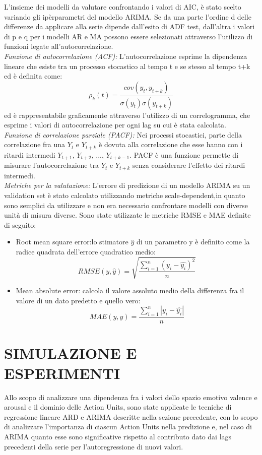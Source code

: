 \documentclass[10pt,journal,compsoc]{IEEEtran}
\begin{document}
L'insieme dei modelli da valutare confrontando i valori di AIC, è stato scelto variando gli ipèrparametri del modello ARIMA. Se da una parte l'ordine d delle differenze da applicare alla serie  dipende dall'esito di ADF test, dall'altra i valori di p e q per i modelli AR e MA possono essere selezionati attraverso l'utilizzo di funzioni legate all'autocorrelazione.\\
\emph{Funzione di autocorrelazione (ACF):}
L’autocorrelazione esprime la dipendenza lineare che esiste tra un processo stocastico al tempo t e se stesso al tempo t+k ed è definita come:
\[\rho_k(t) = \frac{cov(y_t, y_{t+k})}{\sigma(y_t)\sigma(y_{t+k})} \tag{17} \]
ed è rappresentabile graficamente attraverso l'utilizzo di un correlogramma, che esprime i valori di autocorrelazione per ogni lag su cui è stata calcolata.\\
\emph{Funzione di correlazione parziale (PACF):}
Nei processi stocastici, parte della correlazione fra una  \(Y_t\) e \(Y_{t+k}\) è dovuta alla correlazione che esse hanno con i ritardi intermedi \(Y_{t+1}\), \(Y_{t+2}\), ..., \(Y_{t+k-1}\). PACF è una funzione permette di misurare l'autocorrelazione tra  \(Y_t\) e \(Y_{t+k}\) senza considerare l'effetto dei ritardi intermedi.\\
\emph{Metriche per la valutazione:}
L'errore di predizione di un modello ARIMA su un validation set è stato calcolato utilizzando metriche scale-dependent,in quanto sono semplici da utilizzare e non era necessario confrontare modelli con diverse unità di misura diverse. Sono state utilizzate le metriche RMSE e MAE definite di seguito:
\begin{itemize}
    \item Root mean square error:lo stimatore \(\hat{y}\) di un parametro y è definito come la radice quadrata dell'errore quadratico medio:
    \[RMSE(y,\hat{y}) = \sqrt{\frac{\sum_{i=1}^{n} (y_i - \hat{y_i})^2} {n}} \tag{18}\]

    \item Mean absolute error: calcola il valore assoluto medio della differenza fra il valore di un dato predetto e quello vero:
    \[MAE(y,\hat{y}) = \frac{\sum_{i=1}^{n} |y_i - \hat{y_i}|} {n}\tag{19}\]
\end{itemize}



\section{SIMULAZIONE E ESPERIMENTI}\label{sec:simulazione}
\textbf{}
Allo scopo di analizzare una dipendenza fra i valori dello spazio emotivo valence e arousal e il dominio delle Action Units, sono state applicate le tecniche di regressione lineare ARD e ARIMA descritte nella sezione precedente, con lo scopo di analizzare l'importanza di ciascun Action Units nella predizione e, nel caso di ARIMA quanto esse sono significative rispetto al contributo dato dai lags precedenti della serie per l'autoregressione di nuovi valori.
\end{document}
